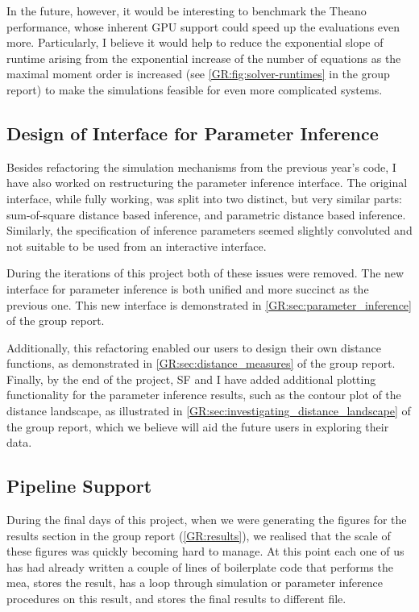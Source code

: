 In the future, however, it would be interesting to benchmark the Theano performance, whose inherent GPU support could speed up the evaluations even more.
Particularly, I believe it would help to reduce the exponential slope of runtime arising from the exponential increase of the number of equations as the maximal moment order is increased (see \autoref{GR:fig:solver-runtimes} in the group report) to make the simulations feasible for even more complicated systems.

\subsection{Design of Interface for Parameter Inference}

Besides refactoring the simulation mechanisms from the previous year's code, I have also worked on restructuring the parameter inference interface. 
The original interface, while fully working, was split into two distinct, but very similar parts: sum-of-square distance based inference, and parametric distance based inference. Similarly, the specification of inference parameters seemed slightly convoluted and not suitable to be used from an interactive interface. 

During the iterations of this project both of these issues were removed. The new interface for parameter inference is
both unified and more succinct as the previous one. This new interface is demonstrated in \autoref*{GR:sec:parameter_inference} of the group report.

Additionally, this refactoring enabled our users to design their own distance functions, as demonstrated in \autoref*{GR:sec:distance_measures} of the group report.
Finally, by the end of the project, SF and I have added additional plotting functionality for the parameter inference results, such as the contour plot of the distance landscape, as illustrated in 
\autoref*{GR:sec:investigating_distance_landscape} of the group report, which we believe will aid the future users in exploring their data.

\subsection{Pipeline Support}

During the final days of this project, when we were generating the figures for the results section in the group report (\autoref{GR:results}), we realised that the scale of these figures was quickly becoming hard to manage. 
At this point each one of us has had already written a couple of lines of boilerplate code that performs the \acrlong{mea}, stores the result,  has a loop through simulation or parameter inference procedures on this result, and stores the final results to different file.

